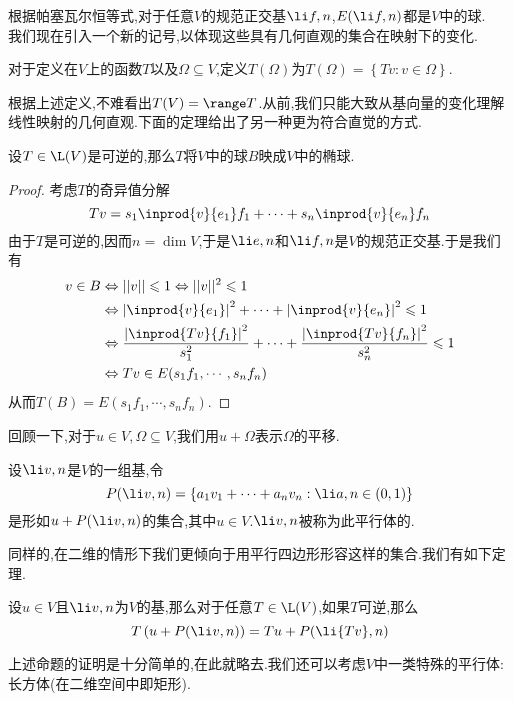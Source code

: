 \documentclass{ctexart}
\begin{document}
根据帕塞瓦尔恒等式,对于任意$V$的规范正交基$\li f,n$,$E(\li f,n)$都是$V$中的球.\\
我们现在引入一个新的记号,以体现这些具有几何直观的集合在映射下的变化.
\begin{definition}[4.3 定义:$T(\Omega)$]
    对于定义在$V$上的函数$T$以及$\Omega\subseteq V$,定义$T(\Omega)$为$T(\Omega)=\left\{Tv:v\in\Omega\right\}$.
\end{definition}\noindent
根据上述定义,不难看出$T(V)=\range T$.从前,我们只能大致从基向量的变化理解线性映射的几何直观.下面的定理给出了另一种更为符合直觉的方式.
\begin{formal}[4.4 可逆算子化球为椭球]
    设$T\in\L(V)$是可逆的,那么$T$将$V$中的球$B$映成$V$中的椭球.
\end{formal}
\begin{proof}
    考虑$T$的奇异值分解
    \[Tv=s_1\inprod{v}{e_1}f_1+\cdots+s_n\inprod{v}{e_n}f_n\]
    由于$T$是可逆的,因而$n=\dim V$,于是$\li e,n$和$\li f,n$是$V$的规范正交基.于是我们有
    \[\begin{aligned}
        v\in B
        &\Leftrightarrow ||v||\leqslant 1 \Leftrightarrow ||v||^2\leqslant 1 \\
        &\Leftrightarrow \left|\inprod{v}{e_1}\right|^2+\cdots+\left|\inprod{v}{e_n}\right|^2\leqslant 1 \\
        &\Leftrightarrow \dfrac{\left|\inprod{Tv}{f_1}\right|^2}{s_1^2}+\cdots+\dfrac{\left|\inprod{Tv}{f_n}\right|^2}{s_n^2}\leqslant 1 \\
        &\Leftrightarrow Tv\in E(s_1f_1,\cdots,s_nf_n)
    \end{aligned}\]
    从而$T(B)=E(s_1f_1,\cdots,s_nf_n)$.
\end{proof}\noindent
回顾一下,对于$u\in V,\Omega\subseteq V$,我们用$u+\Omega$表示$\Omega$的平移.
\begin{definition}[4.5 定义:$P(\li v,n)$,平行体]
    设$\li v,n$是$V$的一组基,令
    \[P(\li v,n)=\left\{a_1v_1+\cdots+a_nv_n:\li a,n\in(0,1)\right\}\]
    是形如$u+P(\li v,n)$的集合,其中$u\in V$.$\li v,n$被称为此平行体的.
\end{definition}\noindent
同样的,在二维的情形下我们更倾向于用平行四边形形容这样的集合.我们有如下定理.
\begin{formal}[4.6 可逆算子化平行体为平行体]
    设$u\in V$且$\li v,n$为$V$的基,那么对于任意$T\in\L(V)$,如果$T$可逆,那么
    \[T\left(u+P(\li v,n)\right)=Tu+P(\li {Tv},n)\]
\end{formal}\noindent
上述命题的证明是十分简单的,在此就略去.我们还可以考虑$V$中一类特殊的平行体:长方体(在二维空间中即矩形).
\end{document}
